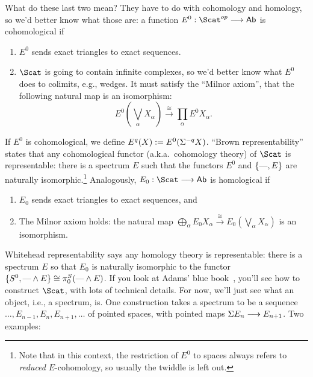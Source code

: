What do these last two mean?  They have to do with cohomology and homology, so we'd better know what those are: a function $E^0: \Scat^{op} \to \Ab$ is cohomological if
\begin{enumerate}
\item $E^0$ sends exact triangles to exact sequences.
\item $\Scat$ is going to contain infinite complexes, so we'd better know what $E^0$ does to colimits, e.g., wedges. It must satisfy the ``Milnor axiom'', that the following natural map is an isomorphism:
\[
E^0\left({\bigvee}_\alpha X_\alpha\right) \xrightarrow{\cong} \prod_\alpha E^0 X_\alpha
.\]
\end{enumerate}
If $E^0$ is cohomological, we define $E^q (X) := E^0 (\Sigma^{-q} X)$. ``Brown representability'' states that any cohomological functor (a.k.a.\ cohomology theory) of $\Scat$ is representable: there is a spectrum $E$ such that the functors $E^0$ and $\{\textup{---}, E\}$ are naturally isomorphic.\footnote{Note that in this context, the restriction of $E^0$ to spaces always refers to \emph{reduced} $E$-cohomology, so usually the twiddle is left out.}  Analogously, $E_0: \Scat \to \Ab$ is homological if
\begin{enumerate}
\item $E_0$ sends exact triangles to exact sequences, and
\item The Milnor axiom holds: the natural map $\bigoplus_\alpha E_0 X_\alpha \xrightarrow{\cong} E_0(\bigvee_\alpha X_\alpha)$ is an isomorphism.
\end{enumerate}
Whitehead representability says any homology theory is representable: there is a spectrum $E$ so that $E_0$ is naturally isomorphic to the functor $\{S^0, \text{---} \wedge E\} \cong \pi^S_0(\text{---} \wedge E)$.  If you look at Adams' blue book~\cite{Adams}, you'll see how to construct $\Scat$, with lots of technical details.  For now, we'll just see what an object, i.e., a spectrum, is.  One construction takes a spectrum to be a sequence $\ldots, E_{n-1}, E_n, E_{n+1}, \ldots$ of pointed spaces, with pointed maps $\Sigma E_n \longrightarrow E_{n+1}$.  Two examples:
